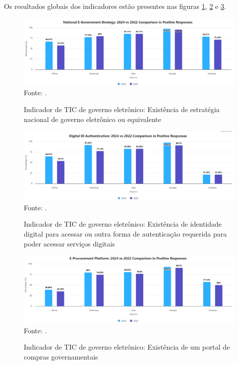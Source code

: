 Os resultados globais dos indicadores estão presentes nas figuras \ref{fig:national_government_strategy}, \ref{fig:national_identity} e \ref{fig:procurement_portal}.

\begin{figure}[H]
	\centering
	\caption{Indicador de TIC de governo eletrônico: Existência de estratégia nacional de governo eletrônico ou equivalente}
	\includegraphics[width=1\linewidth]{figuras/national_government_strategy}
	\label{fig:national_government_strategy}
	\footnotesize{Fonte: \cite{ONU_ICT_in_government_indicators}.}
\end{figure}

\begin{figure}[H]
	\centering
	\caption{Indicador de TIC de governo eletrônico: Existência de identidade digital para acessar ou outra forma de autenticação requerida para poder acessar serviços digitais}
	\includegraphics[width=1\linewidth]{figuras/digital_identity}
	\label{fig:national_identity}
	\footnotesize{Fonte: \cite{ONU_ICT_in_government_indicators}.}
\end{figure}

\begin{figure}[H]
	\centering
	\caption{Indicador de TIC de governo eletrônico: Existência de um portal de compras governamentais}
	\includegraphics[width=1\linewidth]{figuras/procurement_portal}
	\label{fig:procurement_portal}
	\footnotesize{Fonte: \cite{ONU_ICT_in_government_indicators}.}
\end{figure}

